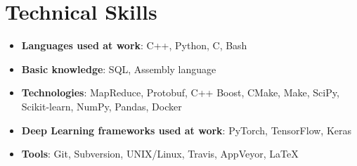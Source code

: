 \documentclass[letterpaper,11pt]{article}
\newcommand{\resumeItem}[2]{
  \item\small{
    \textbf{#1}{: #2 \vspace{-2pt}}
  }
}
\newcommand{\resumeSubItem}[2]{\resumeItem{#1}{#2}\vspace{-4pt}}
\newcommand{\resumeSubHeadingListStart}{\begin{itemize}[leftmargin=*]}
\newcommand{\resumeSubHeadingListEnd}{\end{itemize}}
\begin{document}
\vspace{-22pt}
\section{Technical Skills}
  \resumeSubHeadingListStart
    \resumeSubItem{Languages used at work}{C++, Python, C, Bash}
    \resumeSubItem{Basic knowledge}{SQL, Assembly language}
    \resumeSubItem{Technologies}{MapReduce, Protobuf, C++ Boost, CMake, Make, SciPy, Scikit-learn, NumPy, Pandas, Docker}
    \resumeSubItem{Deep Learning frameworks used at work}{PyTorch, TensorFlow, Keras}
    \resumeSubItem{Tools}{Git, Subversion, UNIX/Linux, Travis, AppVeyor, \LaTeX}
  \resumeSubHeadingListEnd


\end{document}
